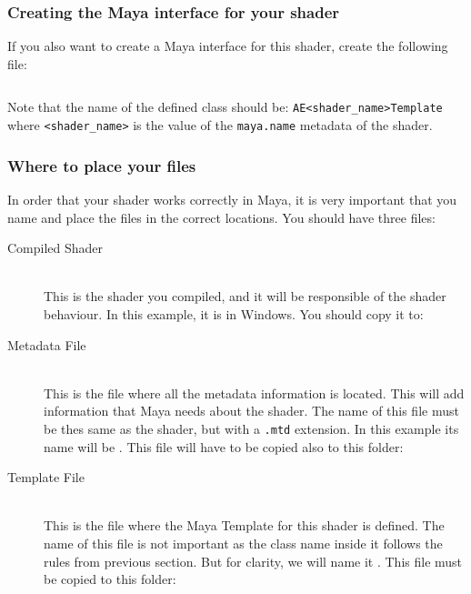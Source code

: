 \subsubsection{Creating the Maya interface for your shader}

If you also want to create a Maya interface for this shader, create the following file:\\

\inputminted[mathescape,
linenos,
numbersep=5pt,
frame=lines,
framesep=2mm,
baselinestretch=1,
fontsize=\footnotesize,
tabsize=3,
label=aiSimpleTemplate.py]
{python}{aiSimpleTemplate.py}

Note that the name of the defined class should be: \verb|AE<shader_name>Template| where \verb|<shader_name>| is the value of the \verb|maya.name| metadata of the shader.

\subsubsection{Where to place your files}

In order that your shader works correctly in Maya, it is very important that you name and place the files in the correct locations. You should have three files:

\begin{description}

\item[Compiled Shader] \hfill \\
This is the shader you compiled, and it will be responsible of the shader behaviour. In this example, it is  in Windows. You should copy it to:
\\

\item[Metadata File] \hfill \\
This is the file where all the metadata information is located. This will add information that Maya needs about the shader. The name of this file must be thes same as the shader,
but with a \texttt{.mtd} extension. In this example its name will be . This file will have to be copied also to this folder:
\\

\item[Template File] \hfill \\
This is the file where the Maya Template for this shader is defined. The name of this file is not important as the class name inside it follows the rules from previous section.
But for clarity, we will name it . This file must be copied to this folder:
\\

\end{description}

